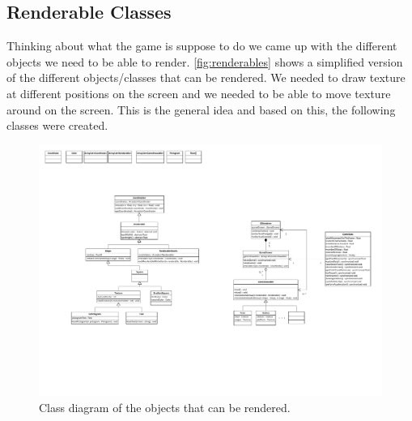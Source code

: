 \subsection{Renderable Classes}

Thinking about what the game is suppose to do we came up with the different objects we need to be able to render. \autoref{fig:renderables} shows a simplified version of the different objects/classes that can be rendered. We needed to draw texture at different positions on the screen and we needed to be able to move texture around on the screen. This is the general idea and based on this, the following classes were created.

\begin{figure}[H]
\centering
\includegraphics[page=2,width=1\linewidth]{img/opengl.pdf}
\caption{Class diagram of the objects that can be rendered.}
\label{fig:renderables}
\end{figure}


